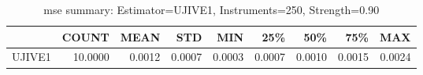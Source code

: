\begin{table}[ht]
\centering
\caption{mse summary: Estimator=UJIVE1, Instruments=250, Strength=0.90}
\begin{tabular}{lrrrrrrrr}
\toprule
 & COUNT & MEAN & STD & MIN & 25\% & 50\% & 75\% & MAX \\
\midrule
UJIVE1 & 10.0000 & 0.0012 & 0.0007 & 0.0003 & 0.0007 & 0.0010 & 0.0015 & 0.0024 \\
\bottomrule
\end{tabular}
\end{table}
